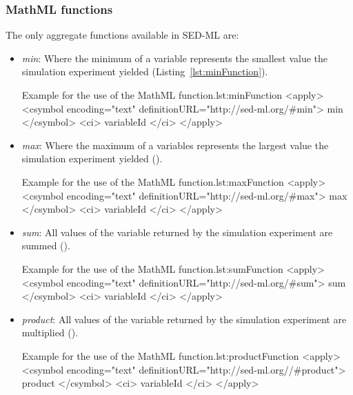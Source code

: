 \subsubsection{MathML functions}
The only aggregate functions available in SED-ML \currentLV are:

\begin{itemize}\setlength{\parskip}{-0.1ex}

\item \emph{min}: Where the minimum of a variable represents the smallest value 
the simulation experiment yielded (Listing~\ref{lst:minFunction}). 

\begin{myXmlLst}{Example for the use of the MathML  function.}{lst:minFunction}
<apply>
 	<csymbol encoding="text" definitionURL="http://sed-ml.org/#min">
 		min
 	</csymbol>
 	<ci> variableId </ci>
</apply>
\end{myXmlLst}

\item \emph{max}: Where the maximum of a variables represents the largest value 
the simulation experiment yielded ().

\begin{myXmlLst}{Example for the use of the MathML  function.}{lst:maxFunction}
<apply>
 	<csymbol encoding="text" definitionURL="http://sed-ml.org/#max">
 		max
 	</csymbol>
 	<ci> variableId </ci>
</apply>
\end{myXmlLst}

\item \emph{sum}: All values of the variable returned by the simulation 
experiment are summed ().

\begin{myXmlLst}{Example for the use of the MathML  function.}{lst:sumFunction}
<apply>
 	<csymbol encoding="text" definitionURL="http://sed-ml.org/#sum">
 		sum
 	</csymbol>
 	<ci> variableId </ci>
</apply>
\end{myXmlLst}

\item \emph{product}: All values of the variable returned by the simulation 
experiment are multiplied ().
%
\begin{myXmlLst}{Example for the use of the MathML  function.}{lst:productFunction}
<apply>
 	<csymbol encoding="text" definitionURL="http://sed-ml.org//#product">
 		product
 	</csymbol>
 	<ci> variableId </ci>
</apply>
\end{myXmlLst}

\end{itemize}

